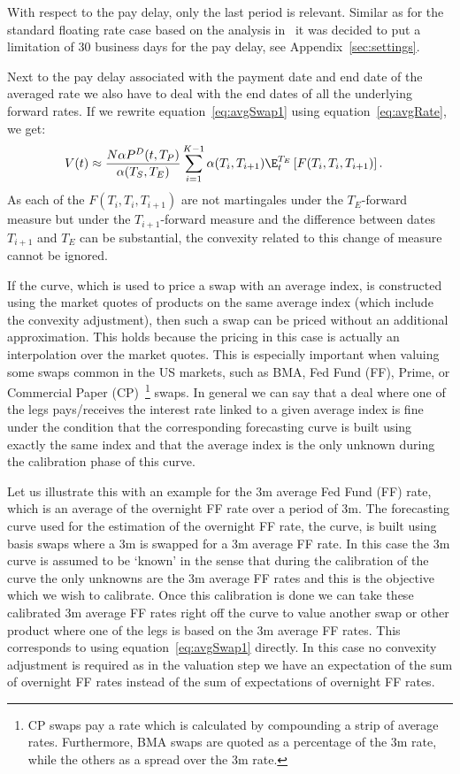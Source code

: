 \documentclass[]{pmv_report} %
\begin{document}
With respect to the pay delay, only the last period is relevant.
Similar as for the standard floating rate case based on the analysis in~\cite{Quark.RateAdj} it was decided to put a limitation of $30$ business days for the pay delay, see Appendix~\ref{sec:settings}.

Next to the pay delay associated with the payment date and end date of the averaged rate we also have to deal with the end dates of all the underlying forward rates.
If we rewrite equation~\eqref{eq:avgSwap1} using equation~\eqref{eq:avgRate}, we get:
\begin{align}
  V(t) &\approx \frac{N \alpha P^D(t,T_P)}{\alpha(T_S,T_E)} \sum_{i=1}^{K-1} \alpha(T_i,T_{i+1}) \E^{T_E}_t\left[ F(T_i,T_i,T_{i+1})\right].\label{eq:avgSwap2}
\end{align}
As each of the $F(T_i,T_i,T_{i+1})$ are not martingales under the $T_E$-forward measure but under the $T_{i+1}$-forward measure and the difference between dates $T_{i+1}$ and $T_E$ can be substantial, the convexity related to this change of measure cannot be ignored.

If the curve, which is used to price a swap with an average index, is constructed using the market quotes of products on the same average index (which include the convexity adjustment), then such a swap can be priced without an additional approximation.
This holds because the pricing in this case is actually an interpolation over the market quotes.
This is especially important when valuing some swaps common in the US markets, such as BMA, Fed Fund (FF), Prime, or Commercial Paper (CP)~\footnote{CP swaps pay a rate which is calculated by compounding a strip of average rates. Furthermore, BMA swaps are quoted as a percentage of the 3m \Libor rate, while the others as a spread over the 3m \Libor rate.} swaps.
In general we can say that a deal where one of the legs pays/receives the interest rate linked to a given average index is fine under the condition that the corresponding forecasting curve is built using exactly the same index and that the average index is the only unknown during the calibration phase of this curve.

Let us illustrate this with an example for the 3m average Fed Fund (FF) rate, which is an average of the overnight FF rate over a period of 3m.
The forecasting curve used for the estimation of the overnight FF rate, the  curve, is built using basis swaps where a 3m \Libor is swapped for a 3m average FF rate.
In this case the 3m \Libor curve is assumed to be `known' in the sense that during the calibration of the  curve the only unknowns are the 3m average FF rates and this is the objective which we wish to calibrate.
Once this calibration is done we can take these calibrated 3m average FF rates right off the curve to value another swap or other product where one of the legs is based on the 3m average FF rates.
This corresponds to using equation~\eqref{eq:avgSwap1} directly.
In this case no convexity adjustment is required as in the valuation step we have an expectation of the sum of overnight FF rates instead of the sum of expectations of overnight FF rates.
\end{document}
